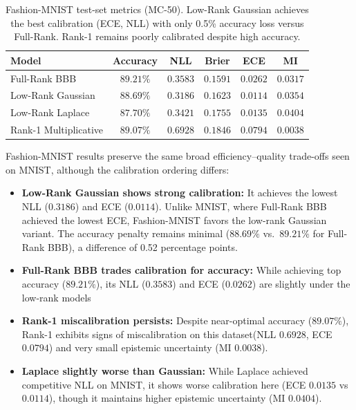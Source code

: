 \documentclass{article}
\theoremstyle{plain}
\theoremstyle{definition}
\theoremstyle{remark}
\begin{document}
\begin{table}[h]
\centering
\small
\begin{tabular}{l c c c c c}
\toprule
\textbf{Model} & \textbf{Accuracy} & \textbf{NLL} & \textbf{Brier} & \textbf{ECE} & \textbf{MI} \\
\midrule
Full-Rank BBB & $89.21\%$ & $0.3583$ & $0.1591$ & $0.0262$ & $0.0317$ \\
Low-Rank Gaussian & $88.69\%$ & $0.3186$ & $0.1623$ & $\mathbf{0.0114}$ & $0.0354$ \\
Low-Rank Laplace & $87.70\%$ & $0.3421$ & $0.1755$ & $0.0135$ & $0.0404$ \\
Rank-1 Multiplicative & $89.07\%$ & $0.6928$ & $0.1846$ & $0.0794$ & $0.0038$ \\
\bottomrule
\end{tabular}
\caption{Fashion-MNIST test-set metrics (MC-50). Low-Rank Gaussian achieves the best calibration (ECE, NLL) with only 0.5\% accuracy loss versus Full-Rank. Rank-1 remains poorly calibrated despite high accuracy.}
\label{tab:results_fmnist}
\end{table}
Fashion-MNIST results preserve the same broad efficiency--quality trade-offs seen on MNIST, although the calibration ordering differs:


\begin{itemize}
\item \textbf{Low-Rank Gaussian shows strong calibration:} It achieves the lowest NLL ($0.3186$) and ECE ($0.0114$). Unlike MNIST, where Full-Rank BBB achieved the lowest ECE, Fashion-MNIST favors the low-rank Gaussian variant. The accuracy penalty remains minimal ($88.69\%$ vs.\ $89.21\%$ for Full-Rank BBB), a difference of 0.52 percentage points.

    
    \item \textbf{Full-Rank BBB trades calibration for accuracy:} While achieving top accuracy ($89.21\%$), its NLL ($0.3583$) and ECE ($0.0262$) are slightly under the low-rank models
    \item \textbf{Rank-1 miscalibration persists:} Despite near-optimal accuracy ($89.07\%$), Rank-1 exhibits signs of miscalibration on this dataset(NLL $0.6928$, ECE $0.0794$) and very small epistemic uncertainty (MI $0.0038$).
    
    \item \textbf{Laplace slightly worse than Gaussian:} While Laplace achieved competitive NLL on MNIST, it shows worse calibration here (ECE $0.0135$ vs $0.0114$), though it maintains higher epistemic uncertainty (MI $0.0404$).
\end{itemize}
\end{document}
